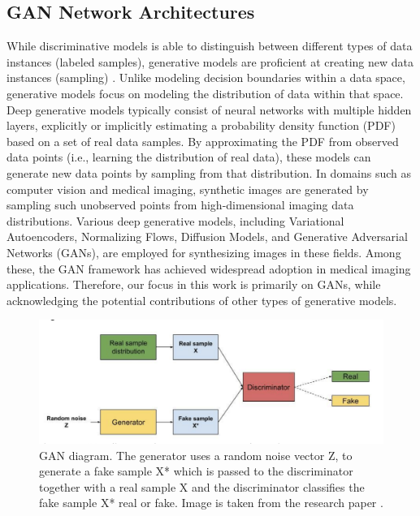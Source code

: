 \documentclass[UKenglish,12pt]{master-style}
\begin{document}
\subsection{GAN Network Architectures}

While discriminative models is able to distinguish between different types of data instances (labeled samples), generative models are proficient at creating new data instances (sampling) \cite{medigan}. Unlike modeling decision boundaries within a data space, generative models focus on modeling the distribution of data within that space. Deep generative models typically consist of neural networks with multiple hidden layers, explicitly or implicitly estimating a probability density function (PDF) based on a set of real data samples. By approximating the PDF from observed data points (i.e., learning the distribution of real data), these models can generate new data points by sampling from that distribution. In domains such as computer vision and medical imaging, synthetic images are generated by sampling such unobserved points from high-dimensional imaging data distributions. Various deep generative models, including Variational Autoencoders, Normalizing Flows, Diffusion Models, and Generative Adversarial Networks (GANs), are employed for synthesizing images in these fields. Among these, the GAN framework has achieved widespread adoption in medical imaging applications. Therefore, our focus in this work is primarily on GANs, while acknowledging the potential contributions of other types of generative models.

\begin{figure}[ht]
    \centering
    \includegraphics[width=1\textwidth]{Images/GAN_architecture}
    \caption{GAN diagram. The generator uses a random noise vector Z, to generate a fake sample X* which is passed to the discriminator together with a real sample X and the discriminator classifies the fake sample X* real or fake.  Image is taken from the research paper \cite{medigan}.}
    \label{fig:gan_framework}
\end{figure}
\end{document}
